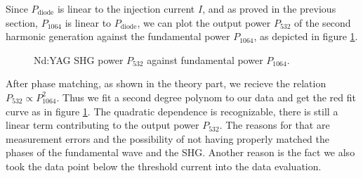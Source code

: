 Since $P_\text{diode}$ is linear to the injection current $I$, and as proved in the previous section, $P_{1064}$ is linear to $P_\text{diode}$, we can plot the output power $P_{532}$ of the second harmonic generation against the fundamental power $P_{1064}$, as depicted in figure \ref{fig:P532}.

\begin{figure}[h]
	\centering
	
	\caption{Nd:YAG SHG power $P_{532}$ against fundamental power $P_{1064}$.}
	\label{fig:P532}
\end{figure}

After phase matching, as shown in the theory part, we recieve the relation $ P_{532}\propto P_{1064}^2$. Thus we fit a second degree polynom to our data and get the red fit curve as in figure \ref{fig:P532}. The quadratic dependence is recognizable, there is still a linear term contributing to the output power $P_{532}$. The reasons for that are measurement errors and the possibility of not having properly matched the phases of the fundamental wave and the SHG. Another reason is the fact we also took the data point below the threshold current into the data evaluation.